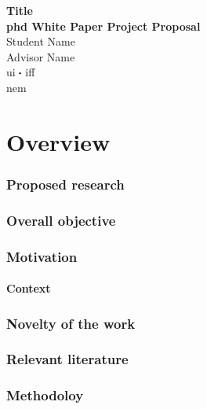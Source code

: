 \documentclass[11pt,letterpaper]{article}
\newcommand*\sq{\mathbin{\vcenter{\hbox{\rule{.3ex}{.3ex}}}}} %
\newcommand{\acl}{\acrlong} %
\newcommand{\acs}{\acrshort} %
\begin{document}
\noindent\makebox[\linewidth]{\rule{\textwidth}{0.5pt}} %


{\centering 
    \textbf{Title\\
    \acs{phd} White Paper Project Proposal\\
    }
    Student Name\\
    Advisor Name\\
    \acl{ui} $\sq$ \acl{iff}\\
    \acl{nem}
\par
}


\noindent\makebox[\linewidth]{\rule{\textwidth}{0.5pt}} %


\linenumbers %
\modulolinenumbers[5] %


\part*{Overview}


\section{Proposed research} 


\section{Overall objective}


\section{Motivation}
\subsection{Context}


\section{Novelty of the work}


\section{Relevant literature}


\section{Methodoloy}
\end{document}
